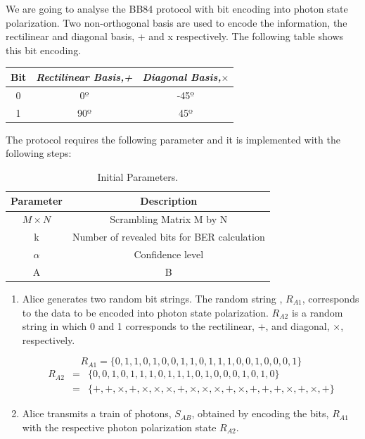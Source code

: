 \begin{refsection}
We are going to analyse the BB84 protocol with bit encoding into photon state polarization. Two non-orthogonal basis are used to encode the information, the rectilinear and diagonal basis, + and x respectively. The following table shows this bit encoding.
\begin{table}[H]
	\centering
	\begin{tabular}{c|c|c}
		 Bit &  \textit{Rectilinear Basis,+} & \textit{Diagonal Basis,$\times$}\\ \hline
		0 &  0$º$ & -45$º$ \\
		1 & 90$º$ & 45$º$\\
	\end{tabular}
\end{table}

The protocol requires the following parameter and it is implemented with the following steps:

\begin{table}[hbt]
	\centering
	\caption{Initial Parameters.}
	\label{tb:param}
	\begin{tabular}{|c|c|}
		\hline
		\textbf{Parameter}  & \textbf{Description} 	   \\ \hline
			$M \times N$    & Scrambling Matrix M by N \\ \hline
			k				& Number of revealed bits for BER calculation \\ \hline
			$\alpha$        & Confidence level 	       \\ \hline
			    A    & B                \\ \hline
	\end{tabular}
\end{table}

\begin{enumerate}
	\item Alice generates two random bit strings. The random string , $R_{A1}$, corresponds to the data to be encoded into photon state polarization. $R_{A2}$ is a random string in which 0 and 1 corresponds to the rectilinear, +, and diagonal, $\times$, respectively.
	
	$$ R_{A1} = \{0,1,1,0,1,0,0,1,1,0,1,1,1,0,0,1,0,0,0,1\}$$
	\begin{eqnarray}
		R_{A2} &=& \{0,0,1,0,1,1,1,0,1,1,1,0,1,0,0,0,1,0,1,0\} \nonumber \\
		&=& \{+,+,\times,+,\times, \times, \times, +,\times, \times, \times,+,\times,+,+,+,\times,+,\times,+\}\nonumber
	\end{eqnarray}
	
	\item Alice transmits a train of photons, $S_{AB}$, obtained by encoding the bits, $R_{A1}$ with the respective photon polarization state $R_{A2}$.
	

\end{enumerate}
\end{refsection}
